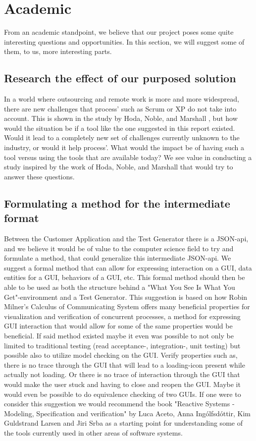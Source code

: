 \section{Academic}

From an academic standpoint, we believe that our project poses some quite interesting questions and opportunities.
In this section, we will suggest some of them, to us, more interesting parts.

\subsection{Research the effect of our purposed solution}
In a world where outsourcing and remote work is more and more widespread, there are new challenges that process' such as Scrum or XP do not take into account.
This is shown in the study by Hoda, Noble, and Marshall \cite{Hoda2011TheIO}, but how would the situation be if a tool like the one suggested in this report existed.
Would it lead to a completely new set of challenges currently unknown to the industry, or would it help process'.
What would the impact be of having such a tool versus using the tools that are available today?
We see value in conducting a study inspired by the work of Hoda, Noble, and Marshall that would try to answer these questions.

\subsection{Formulating a method for the intermediate format}
Between the Customer Application and the Test Generator there is a JSON-api, and we believe it would be of value to the computer science field to try and formulate a method, that could generalize this intermediate JSON-api.
We suggest a formal method that can allow for expressing interaction on a GUI, data entities for a GUI, behaviors of a GUI, etc.
This formal method should then be able to be used as both the structure behind a "What You See Is What You Get"-environment and a Test Generator.
This suggestion is based on how Robin Milner's Calculus of Communicating System offers many beneficial properties for visualization and verification of concurrent processes, a method for expressing GUI interaction that would allow for some of the same properties would be beneficial.
If said method existed maybe it even was possible to not only be limited to traditional testing (read acceptance-, integration-, unit testing) but possible also to utilize model checking on the GUI.
Verify properties such as, there is no trace through the GUI that will lead to a loading-icon present while actually not loading.
Or there is no trace of interaction through the GUI that would make the user stuck and having to close and reopen the GUI.
Maybe it would even be possible to do equivalence checking of two GUIs.
If one were to consider this suggestion we would recommend the book "Reactive Systems - Modeling, Specification and verification" by Luca Aceto, Anna Ingólfsdóttir, Kim Guldstrand Larsen and Jiri Srba as a starting point for understanding some of the tools currently used in other areas of software systems.
